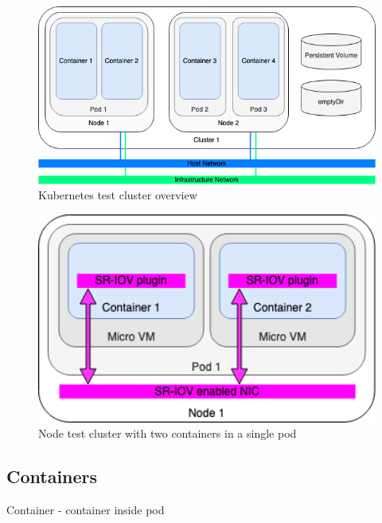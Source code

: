 \begin{figure}[ht]
  \begin{center}
    \includegraphics[width=13.5cm]{LaTeX/images/TestArchitectureCluster.png}
    \caption{Kubernetes test cluster overview}
    \label{fig:TestArchitectureCluster}
  \end{center}
\end{figure}

\begin{figure}[ht]
  \begin{center}
    \includegraphics[width=13.5cm]{LaTeX/images/TestArchitectureNode.png}
    \caption{Node test cluster with two containers in a single pod}
    \label{fig:TestArchitectureNode}
  \end{center}
\end{figure}

\subsection{Containers}

Container - container inside pod

